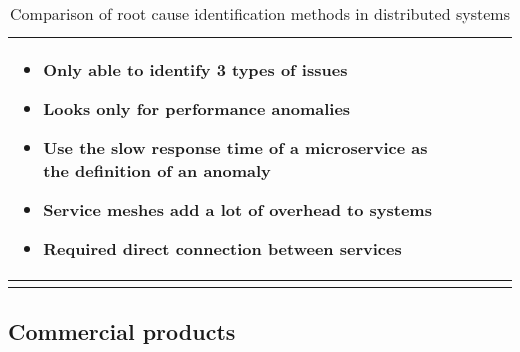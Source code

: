 \begin{longtable}{| p{20mm} | p{43mm} | p{43mm} | p{43mm} |}
\begin{itemize}[leftmargin=*,noitemsep,nolistsep]
    \item Only able to identify 3 types of issues
    \item Looks only for performance anomalies
    \item Use the slow response time of a microservice as the definition of an anomaly
    \item Service meshes add a lot of overhead to systems
    \item Required direct connection between services
  \vspace{-7mm}
  \end{itemize} \\ \hline
  \caption{Comparison of root cause identification methods in distributed systems}
\end{longtable}

\subsection{Commercial products}


